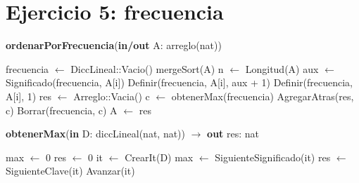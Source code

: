 \section{Ejercicio 5: frecuencia}

\begin{algorithm}[H]
\caption{
    \textbf{ordenarPorFrecuencia}(\textbf{in/out} A: arreglo(nat))
}
    \begin{algorithmic}[1]
        \State frecuencia $\gets$ DiccLineal::Vacio()   
        \State mergeSort(A)    
        \State n $\gets$ Longitud(A) 
         
               
                \State aux $\gets$ Significado(frecuencia, A[i]) 
                \State Definir(frecuencia, A[i], aux + 1)   
            \Else
                \State Definir(frecuencia, A[i], 1) 
            \EndIf
        \EndFor
        \State res $\gets$ Arreglo::Vacia() 
            
            \State c $\gets$ obtenerMax(frecuencia)
                \State AgregarAtras(res, c)
            \EndFor
            \State Borrar(frecuencia, c)
        \EndWhile
        \State A $\gets$ res
    \end{algorithmic}
\end{algorithm}

\begin{algorithm}[H]
    \caption{
        \textbf{obtenerMax}(\textbf{in} D: diccLineal(nat, nat)) $\to$ \textbf{out} res: nat
    }
    \begin{algorithmic}[1]
        \State max $\gets$ 0 
        \State res $\gets$ 0 
        \State it $\gets$ CrearIt(D) 
         
                \State max $\gets$ SiguienteSignificado(it)
                \State res $\gets$ SiguienteClave(it)
            \EndIf
            \State Avanzar(it)
        \EndWhile
    \end{algorithmic}
\end{algorithm}